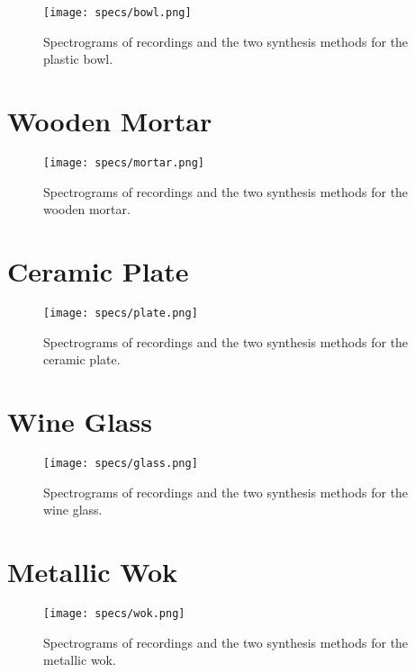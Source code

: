 \begin{figure}[H]
  \centering
    \texttt{[image: specs/bowl.png]}
      \caption{Spectrograms of recordings and the two synthesis methods for the plastic bowl.}
      \label{fig:sp_bowl}
\end{figure}

\newpage

\section*{Wooden Mortar}

\begin{figure}[H]
  \centering
    \texttt{[image: specs/mortar.png]}
      \caption{Spectrograms of recordings and the two synthesis methods for the wooden mortar.}
      \label{fig:sp_mortar}
\end{figure}

\newpage

\section*{Ceramic Plate}

\begin{figure}[H]
  \centering
    \texttt{[image: specs/plate.png]}
      \caption{Spectrograms of recordings and the two synthesis methods for the ceramic plate.}
      \label{fig:sp_plate}
\end{figure}

\newpage

\section*{Wine Glass}

\begin{figure}[H]
  \centering
    \texttt{[image: specs/glass.png]}
      \caption{Spectrograms of recordings and the two synthesis methods for the wine glass.}
      \label{fig:sp_glass}
\end{figure}

\newpage

\section*{Metallic Wok}

\begin{figure}[H]
  \centering
    \texttt{[image: specs/wok.png]}
      \caption{Spectrograms of recordings and the two synthesis methods for the metallic wok.}
      \label{fig:sp_wok}
\end{figure}

